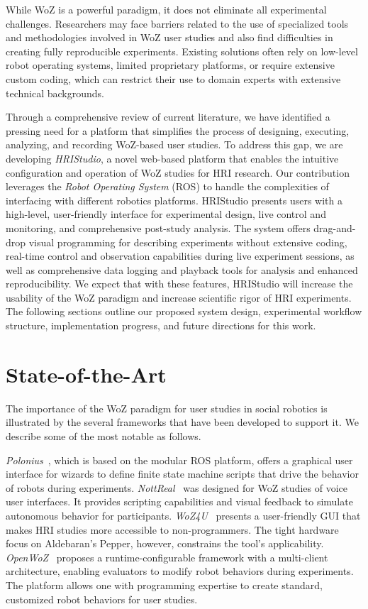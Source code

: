 \documentclass[letterpaper, 10 pt, conference]{ieeeconf}
\begin{document}
While WoZ is a powerful paradigm, it does not eliminate all experimental challenges. Researchers may face barriers related to the use of specialized tools and methodologies involved in WoZ user studies and also find difficulties in creating fully reproducible experiments. Existing solutions often rely on low-level robot operating systems, limited proprietary platforms, or require extensive custom coding, which can restrict their use to domain experts with extensive technical backgrounds.

Through a comprehensive review of current literature, we have identified a pressing need for a platform that simplifies the process of designing, executing, analyzing, and recording WoZ-based user studies. To address this gap, we are developing \emph{HRIStudio},  a novel web-based platform that enables the intuitive configuration and operation of WoZ studies for HRI research. Our contribution leverages the \emph{Robot Operating System} (ROS) to handle the complexities of interfacing with different robotics platforms. HRIStudio presents users with a high-level, user-friendly interface for experimental design, live control and monitoring, and comprehensive post-study analysis. The system offers drag-and-drop visual programming for describing experiments without extensive coding, real-time control and observation capabilities during live experiment sessions, as well as comprehensive data logging and playback tools for analysis and enhanced reproducibility. We expect that with these features, HRIStudio will increase the usability of the  WoZ paradigm and increase scientific rigor of HRI experiments. The following sections outline our proposed system design, experimental workflow structure, implementation progress, and future directions for this work.

\section{State-of-the-Art}

The importance of the WoZ paradigm for user studies in social robotics is illustrated by the several frameworks that have been developed to support it. We describe some of the most notable as follows.

\emph{Polonius}~\cite{Lu2011}, which is based on the modular ROS platform, offers a graphical user interface for wizards to define finite state machine scripts that drive the behavior of robots during experiments. \emph{NottReal}~\cite{Porcheron2020} was designed for WoZ studies of voice user interfaces. It provides scripting capabilities and visual feedback to simulate autonomous behavior for participants. \emph{WoZ4U}~\cite{Rietz2021} presents a user-friendly GUI that makes HRI studies more accessible to non-programmers. The tight hardware focus on Aldebaran's Pepper, however, constrains the tool's applicability. \emph{OpenWoZ}~\cite{Hoffman2016} proposes a runtime-configurable framework with a multi-client architecture, enabling evaluators to modify robot behaviors during experiments. The platform allows one with programming expertise to create standard, customized robot behaviors for user studies.
\end{document}

